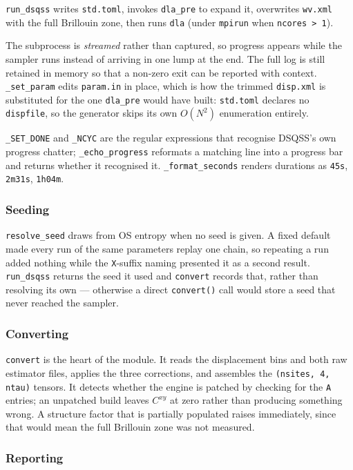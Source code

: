 \documentclass[11pt,a4paper]{article}
\newcommand{\code}[1]{\texttt{#1}}
\begin{document}
\code{run\_dsqss} writes \code{std.toml}, invokes \code{dla\_pre} to expand it,
overwrites \code{wv.xml} with the full Brillouin zone, then runs \code{dla}
(under \code{mpirun} when \code{ncores > 1}).

The subprocess is \emph{streamed} rather than captured, so progress appears
while the sampler runs instead of arriving in one lump at the end. The full log
is still retained in memory so that a non-zero exit can be reported with
context. \code{\_set\_param} edits \code{param.in} in place, which is how the trimmed
\code{disp.xml} is substituted for the one \code{dla\_pre} would have built:
\code{std.toml} declares no \code{dispfile}, so the generator skips its own
$O(N^2)$ enumeration entirely.

\code{\_SET\_DONE} and \code{\_NCYC} are the regular expressions that recognise
DSQSS's own progress chatter; \code{\_echo\_progress} reformats a matching line
into a progress bar and returns whether it recognised it.
\code{\_format\_seconds} renders durations as \code{45s}, \code{2m31s},
\code{1h04m}.

\subsubsection*{Seeding}

\code{resolve\_seed} draws from OS entropy when no seed is given. A fixed
default made every run of the same parameters replay one chain, so repeating a
run added nothing while the \code{X}-suffix naming presented it as a second
result. \code{run\_dsqss} returns the seed it used and \code{convert} records
that, rather than resolving its own --- otherwise a direct \code{convert()} call
would store a seed that never reached the sampler.

\subsubsection*{Converting}

\code{convert} is the heart of the module. It reads the displacement bins and
both raw estimator files, applies the three corrections, and assembles the
\code{(nsites, 4, ntau)} tensors. It detects whether the engine is patched by
checking for the \code{A} entries; an unpatched build leaves $C^{xy}$ at zero
rather than producing something wrong. A structure factor that is partially
populated raises immediately, since that would mean the full Brillouin zone was
not measured.

\subsubsection*{Reporting}
\end{document}
